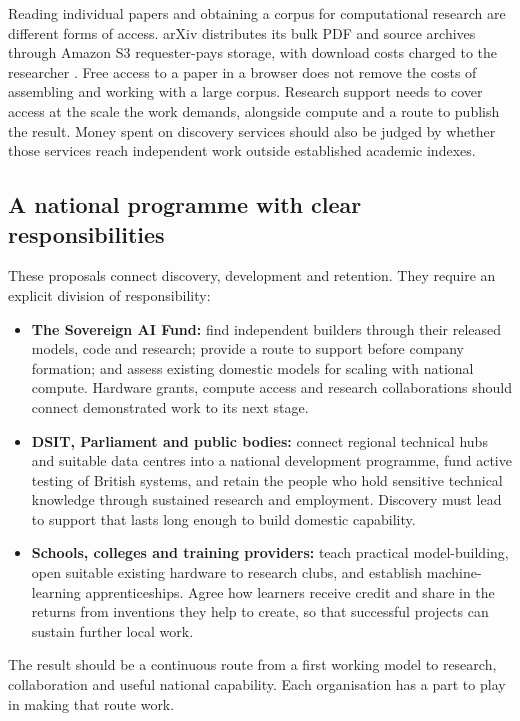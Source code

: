 \documentclass[11pt,a4paper]{article}
\begin{document}
Reading individual papers and obtaining a corpus for computational
research are different forms of access. arXiv distributes its bulk PDF
and source archives through Amazon S3 requester-pays storage, with download
costs charged to the researcher \cite{arxivbulk}. Free access to a paper
in a browser does not remove the costs of assembling and working with a
large corpus. Research support needs to cover access at the scale the work
demands, alongside compute and a route to publish the result. Money spent
on discovery services should also be judged by whether those services
reach independent work outside established academic indexes.

\subsection{A national programme with clear responsibilities}
These proposals connect discovery, development and retention. They require
an explicit division of responsibility:
\begin{itemize}[leftmargin=*,itemsep=5pt]
\item \textbf{The Sovereign AI Fund:} find independent builders through
their released models, code and research; provide a route to support before
company formation; and assess existing domestic models for scaling with
national compute. Hardware grants, compute access and research
collaborations should connect demonstrated work to its next stage.
\item \textbf{DSIT, Parliament and public bodies:} connect regional
technical hubs and suitable data centres into a national development
programme, fund active testing of British systems, and retain the people
who hold sensitive technical knowledge through sustained research and
employment. Discovery must lead to support that lasts long enough to build
domestic capability.
\item \textbf{Schools, colleges and training providers:} teach practical
model-building, open suitable existing hardware to research clubs, and
establish machine-learning apprenticeships. Agree how learners receive
credit and share in the returns from inventions they help to create, so
that successful projects can sustain further local work.
\end{itemize}
The result should be a continuous route from a first working model to
research, collaboration and useful national capability. Each organisation
has a part to play in making that route work.
\end{document}

